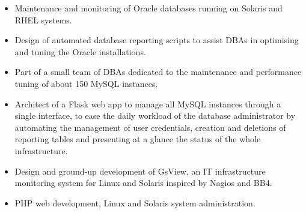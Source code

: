 \documentclass{resume}
\begin{document}

%


\begin{itemize}
\item Maintenance and monitoring of Oracle databases running on Solaris and RHEL systems.
\item Design of automated database reporting scripts to assist DBAs in optimising and tuning the Oracle installations.
\end{itemize}


%


\begin{itemize}
\item Part of a small team of DBAs dedicated to the maintenance and performance tuning of about 150 MySQL instances.
\item Architect of a Flask web app to manage all MySQL instances through a single interface, to ease the daily workload of the database administrator by automating the management of user credentials, creation and deletions of reporting tables and presenting at a glance the status of the whole infrastructure.
\end{itemize}


%


\begin{itemize}
\item Design and ground-up development of GsView, an IT infrastructure monitoring system for Linux and Solaris inspired by Nagios and BB4.
\item PHP web development, Linux and Solaris system administration.
\end{itemize}

\end{document}
